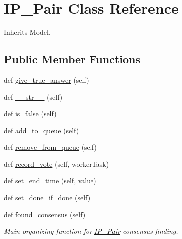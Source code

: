 \hypertarget{classdynamicfilterapp_1_1models_1_1_i_p___pair}{}\section{I\+P\+\_\+\+Pair Class Reference}
\label{classdynamicfilterapp_1_1models_1_1_i_p___pair}


Inherits Model.

\subsection*{Public Member Functions}
\begin{DoxyCompactItemize}
\item 
def \mbox{\hyperlink{classdynamicfilterapp_1_1models_1_1_i_p___pair_a13fca2f105fb534c24f1cfb2abb2c85a}{give\+\_\+true\+\_\+answer}} (self)
\item 
def \mbox{\hyperlink{classdynamicfilterapp_1_1models_1_1_i_p___pair_a23e8041ce1015febe4fdace3225714f9}{\+\_\+\+\_\+str\+\_\+\+\_\+}} (self)
\item 
def \mbox{\hyperlink{classdynamicfilterapp_1_1models_1_1_i_p___pair_a9ea3f5304734ea61cc64bb827a640601}{is\+\_\+false}} (self)
\item 
def \mbox{\hyperlink{classdynamicfilterapp_1_1models_1_1_i_p___pair_ac83cd255885b9a7b8852cd66fad6da53}{add\+\_\+to\+\_\+queue}} (self)
\item 
def \mbox{\hyperlink{classdynamicfilterapp_1_1models_1_1_i_p___pair_a438b59c52d810e87114f98c1996d6272}{remove\+\_\+from\+\_\+queue}} (self)
\item 
def \mbox{\hyperlink{classdynamicfilterapp_1_1models_1_1_i_p___pair_ad5b3eb8ce467b3f59a854be3fd0d10f1}{record\+\_\+vote}} (self, worker\+Task)
\item 
def \mbox{\hyperlink{classdynamicfilterapp_1_1models_1_1_i_p___pair_a162297e8bb5e9091aa3236a770e28004}{set\+\_\+end\+\_\+time}} (self, \mbox{\hyperlink{classdynamicfilterapp_1_1models_1_1_i_p___pair_afcc7a4b78ecd8fa7e713f8cfa0f51017}{value}})
\item 
def \mbox{\hyperlink{classdynamicfilterapp_1_1models_1_1_i_p___pair_a5facdfe9e351f3e0ea3126454b41f2b9}{set\+\_\+done\+\_\+if\+\_\+done}} (self)
\item 
def \mbox{\hyperlink{classdynamicfilterapp_1_1models_1_1_i_p___pair_a9b963fe3640eebb2f1fe833cb906a13d}{found\+\_\+consensus}} (self)
\begin{DoxyCompactList}\small\item\em Main organizing function for \mbox{\hyperlink{classdynamicfilterapp_1_1models_1_1_i_p___pair}{I\+P\+\_\+\+Pair}} consensus finding. \end{DoxyCompactList}\item 

\end{DoxyCompactItemize}
